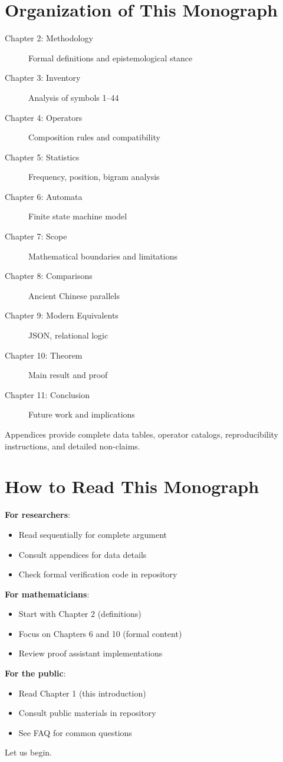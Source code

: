 \section{Organization of This Monograph}

\begin{description}
    \item[Chapter 2: Methodology] Formal definitions and epistemological stance
    \item[Chapter 3: Inventory] Analysis of symbols 1--44
    \item[Chapter 4: Operators] Composition rules and compatibility
    \item[Chapter 5: Statistics] Frequency, position, bigram analysis
    \item[Chapter 6: Automata] Finite state machine model
    \item[Chapter 7: Scope] Mathematical boundaries and limitations
    \item[Chapter 8: Comparisons] Ancient Chinese parallels
    \item[Chapter 9: Modern Equivalents] JSON, relational logic
    \item[Chapter 10: \TCOP{} Theorem] Main result and proof
    \item[Chapter 11: Conclusion] Future work and implications
\end{description}

Appendices provide complete data tables, operator catalogs, reproducibility instructions, and detailed non-claims.

\section{How to Read This Monograph}

\textbf{For researchers}:
\begin{itemize}
    \item Read sequentially for complete argument
    \item Consult appendices for data details
    \item Check formal verification code in repository
\end{itemize}

\textbf{For mathematicians}:
\begin{itemize}
    \item Start with Chapter 2 (definitions)
    \item Focus on Chapters 6 and 10 (formal content)
    \item Review proof assistant implementations
\end{itemize}

\textbf{For the public}:
\begin{itemize}
    \item Read Chapter 1 (this introduction)
    \item Consult public materials in repository
    \item See FAQ for common questions
\end{itemize}

Let us begin.
